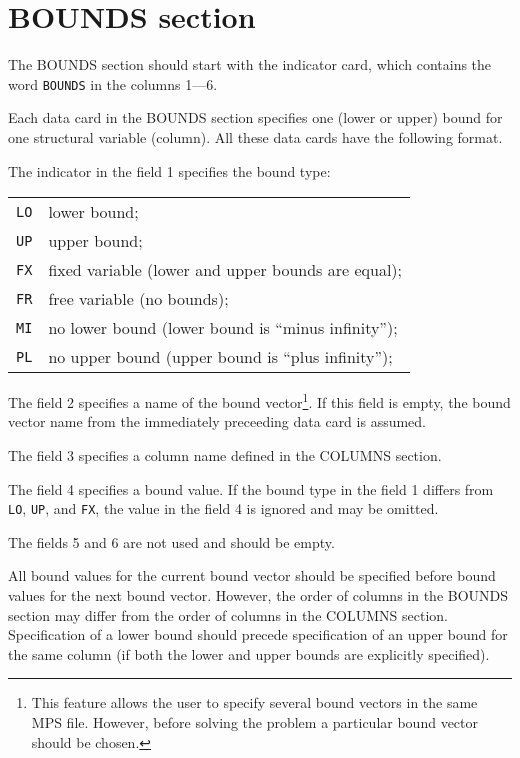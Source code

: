 \section{BOUNDS section}
\label{secbounds}

The BOUNDS section should start with the indicator card, which contains
the word \verb|BOUNDS| in the columns 1---6.

Each data card in the BOUNDS section specifies one (lower or upper)
bound for one structural variable (column). All these data cards have
the following format.

The indicator in the field 1 specifies the bound type:

\begin{tabular}{@{}ll}
\verb|LO| & lower bound; \\
\verb|UP| & upper bound; \\
\verb|FX| & fixed variable (lower and upper bounds are equal); \\
\verb|FR| & free variable (no bounds); \\
\verb|MI| & no lower bound (lower bound is ``minus infinity''); \\
\verb|PL| & no upper bound (upper bound is ``plus infinity''); \\
\end{tabular}

The field 2 specifies a name of the bound vector\footnote{This feature
allows the user to specify several bound vectors in the same MPS file.
However, before solving the problem a particular bound vector should be
chosen.}. If this field is empty, the bound vector name from the
immediately preceeding data card is assumed.

The field 3 specifies a column name defined in the COLUMNS section.

The field 4 specifies a bound value. If the bound type in the field 1
differs from \verb|LO|, \verb|UP|, and \verb|FX|, the value in the field
4 is ignored and may be omitted.

The fields 5 and 6 are not used and should be empty.

All bound values for the current bound vector should be specified before
bound values for the next bound vector. However, the order of columns in
the BOUNDS section may differ from the order of columns in the COLUMNS
section. Specification of a lower bound should precede specification of
an upper bound for the same column (if both the lower and upper bounds
are explicitly specified).

